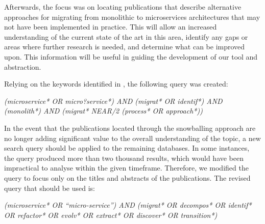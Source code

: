 Afterwards, the focus was on locating publications that describe alternative
approaches for migrating from monolithic to microservices architectures that
may not have been implemented in practice. This will allow an increased
understanding of the current state of the art in this area, identify any gaps
or areas where further research is needed, and determine what can be improved
upon. This information will be useful in guiding the development of our tool
and abstraction.

Relying on the keywords identified in , the following
query was created:

\begin{center}
  \emph{(microservice* OR micro?service*) AND (migrat* OR identif*) AND
  (monolith*) AND (migrat* NEAR/2 (process* OR approach*))}
\end{center}

In the event that the publications located through the snowballing approach are
no longer adding significant value to the overall understanding of the topic, a
new search query should be applied to the remaining databases. In some
instances, the query produced more than two thousand results, which would have
been impractical to analyse within the given timeframe. Therefore, we modified
the query to focus only on the titles and abstracts of the publications. The
revised query that should be used is:

\begin{center}
  \emph{(microservice* OR ``micro-service'') AND (migrat* OR decompos* OR
  identif* OR refactor* OR evolv* OR extract* OR discover* OR transition*)}
\end{center}

